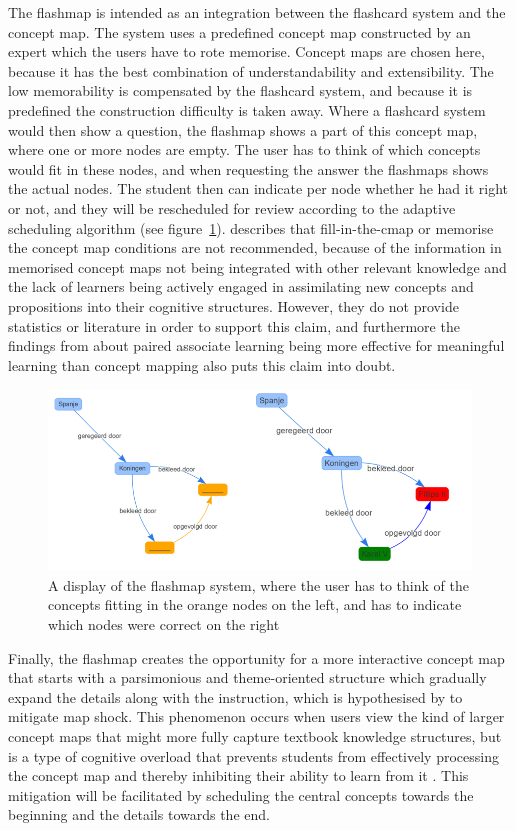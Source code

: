 The flashmap is intended as an integration between the flashcard system and the concept map. The system uses a predefined concept map constructed by an expert which the users have to rote memorise. Concept maps are chosen here, because it has the best combination of understandability and extensibility. The low memorability is compensated by the flashcard system, and because it is predefined the construction difficulty is taken away. Where a flashcard system would then show a question, the flashmap shows a part of this concept map, where one or more nodes are empty. The user has to think of which concepts would fit in these nodes, and when requesting the answer the flashmaps shows the actual nodes. The student then can indicate per node whether he had it right or not, and they will be rescheduled for review according to the adaptive scheduling algorithm (see figure~\ref{fig:flashmap}).  describes that fill-in-the-cmap or memorise the concept map conditions are not recommended, because of the information in memorised concept maps not being integrated with other relevant knowledge and the lack of learners being actively engaged in assimilating new concepts and propositions into their cognitive structures. However, they do not provide statistics or literature in order to support this claim, and furthermore the findings from  about paired associate learning being more effective for meaningful learning than concept mapping also puts this claim into doubt.

\begin{figure}
    \centering
    \includegraphics[width=\textwidth]{img/flashmap}
    \caption{A display of the flashmap system, where the user has to think of the concepts fitting in the orange nodes on the left, and has to indicate which nodes were correct on the right}
    \label{fig:flashmap}
\end{figure}

Finally, the flashmap creates the opportunity for a more interactive concept map that starts with a parsimonious and theme-oriented structure which gradually expand the details along with the instruction, which is hypothesised by  to mitigate map shock. This phenomenon occurs when users view the kind of larger concept maps that might more fully capture textbook knowledge structures, but is a type of cognitive overload that prevents students from effectively processing the concept map and thereby inhibiting their ability to learn from it \cite{moore}. This mitigation will be facilitated by scheduling the central concepts towards the beginning and the details towards the end.

